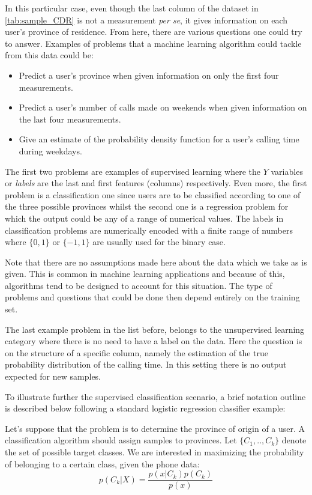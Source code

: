 In this particular case, even though the last column of the dataset in \ref{tab:sample_CDR} is not a measurement \textit{per se}, it gives information on each user's province of residence. From here, there are various questions one could try to answer. Examples of problems that a machine learning algorithm could tackle from this data could be: 

\begin{itemize}
	\item Predict a user's province when given information on only the first four measurements.
	\item Predict a user's number of calls made on weekends when given information on the last four measurements.
	\item Give an estimate of the probability density function for a user's calling time during weekdays.
\end{itemize}

The first two problems are examples of supervised learning where the $Y$ variables or \textit{labels} are the last and first features (columns) respectively. Even more, the first problem is a classification one since users are to be classified according to one of the three possible provinces whilst the second one is a regression problem for which the output could be any of a range of numerical values. The labels in classification problems are numerically encoded with a finite range of numbers where $\{0,1\}$ or $\{-1,1\}$ are usually used for the binary case.

Note that there are no assumptions made here about the data which we take as is given. %
This is common in machine learning applications and because of this, algorithms tend to be designed to account for this situation. The type of problems and questions that could be done then depend entirely on the training set. 

The last example problem in the list before, belongs to the unsupervised learning category where there is no need to have a label on the data. Here the question is on the structure of a specific column, namely the estimation of the true probability distribution of the calling time. In this setting there is no output expected for new samples.

To illustrate further the supervised classification scenario, a brief notation outline is described below following a standard logistic regression classifier example:

Let's suppose that the problem is to determine the province of origin of a user. A classification algorithm should assign samples to provinces. Let $\{C_1,..,C_k\}$ denote the set of possible target classes. We are  interested in maximizing the probability of belonging to a certain class, given the phone data:
$$p(C_k| X) = \frac{p(x|C_k)p(C_k)}{p(x)} $$

